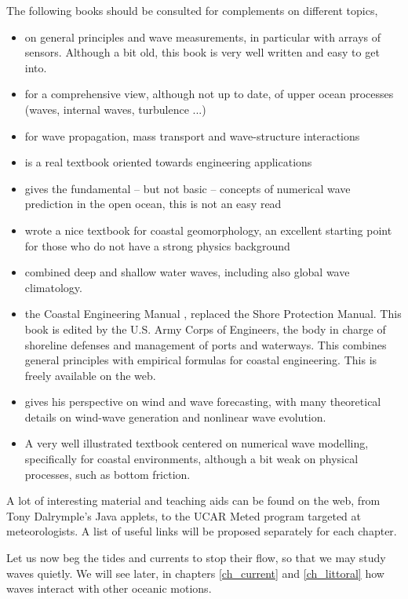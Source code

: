 The following books should be consulted for complements on different topics, 
\begin{itemize}
\item \cite{Kinsman1965} on general principles and wave measurements, in particular with arrays of sensors. Although a bit 
old, this book is very well written and easy to get into. 
\item \cite{Phillips1977} for a comprehensive view, although not up to date, of upper ocean processes (waves, internal waves, turbulence ...) 
\item \cite{Mei1989} for wave propagation, mass transport and wave-structure interactions
\item \cite{Dean&Dalrymple1991} is a real textbook oriented towards engineering applications
\item \cite{WAMBook} gives the fundamental -- but not basic -- concepts of numerical wave prediction 
in the open ocean, this is not an easy read
\item \cite{Komar1998} wrote a nice textbook for coastal geomorphology, an excellent starting point for those 
who do not have a strong physics background
\item \cite{Young1999}  combined deep and shallow water waves, including also global wave climatology. 
\item the Coastal Engineering Manual \citep{USACE2002}, replaced the Shore Protection Manual. This book 
is edited by the U.S. Army Corps of Engineers, the body in charge of shoreline defenses and management of 
ports and waterways. This combines general principles with empirical formulas for coastal engineering. This is 
freely available on the web. 
\item \cite{Janssen2004} gives his perspective on wind and wave forecasting, with many theoretical details on wind-wave 
generation and nonlinear wave evolution. 
\item \cite{Holthuijsen2007} A very well illustrated textbook centered on numerical wave modelling, specifically for coastal environments, although a bit weak on physical processes, such as bottom friction.  
\end{itemize}
A lot of interesting material and teaching aids can be found on the web, from Tony Dalrymple's Java applets, to the UCAR Meted program targeted at meteorologists. A list of useful links will be proposed separately for each chapter. 

Let us now beg the tides and currents to stop their flow, so that we may study waves quietly. We will see later, in chapters \ref{ch_current} and 
\ref{ch_littoral} how waves interact with other oceanic motions. 

